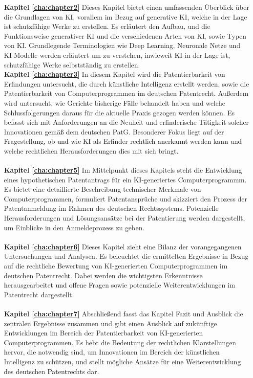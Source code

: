 \textbf{Kapitel \ref{cha:chapter2}} 
Dieses Kapitel bietet einen umfassenden Überblick über die Grundlagen
von KI, vorallem im Bezug auf generative KI, welche in der
Lage ist schutzfähige Werke zu erstellen.
Es erläutert den Aufbau, 
und die Funktionsweise generativer KI 
und die verschiedenen Arten von KI, sowie Typen von KI.
Grundlegende Terminologien wie Deep Learning, Neuronale Netze und
KI-Modelle werden erläutert um zu verstehen, inwieweit KI
in der Lage ist, schutzfähige Werke selbstständig zu erstellen.
\\
\textbf{Kapitel \ref{cha:chapter3}} 
In diesem Kapitel wird die Patentierbarkeit von Erfindungen untersucht,
die durch künstliche Intelligenz erstellt werden, 
sowie die Patentierbarkeit von Computerprogrammen im deutschen Patentrecht. 
Außerdem wird untersucht, wie Gerichte bisherige Fälle behandelt haben 
und welche Schlussfolgerungen daraus für die aktuelle Praxis gezogen werden können. 
Es befasst sich mit Anforderungen an die Neuheit 
und erfinderische Tätigkeit solcher Innovationen gemäß dem deutschen PatG. 
Besonderer Fokus liegt auf der Fragestellung, 
ob und wie KI als Erfinder rechtlich anerkannt werden kann 
und welche rechtlichen Herausforderungen dies mit sich bringt.
\\
\\
\textbf{Kapitel \ref{cha:chapter5}} 
Im Mittelpunkt dieses Kapitels steht die Entwicklung eines hypothetischen Patentantrags 
für ein KI-generiertes Computerprogrammm. 
Es bietet eine detaillierte Beschreibung technischer Merkmale von Computerprogrammen, 
formuliert Patentansprüche und 
skizziert den Prozess der Patentanmeldung im Rahmen des deutschen Rechtssystems. 
Potenzielle Herausforderungen und Lösungsansätze bei der Patentierung werden dargestellt, 
um Einblicke in den Anmeldeprozess zu geben.
\\
\\
\textbf{Kapitel \ref{cha:chapter6}} 
Dieses Kapitel zieht eine Bilanz der vorangegangenen Untersuchungen und Analysen. 
Es beleuchtet die ermittelten Ergebnisse in Bezug auf die rechtliche Bewertung 
von KI-generierten Computerprogrammen im deutschen Patentrecht. 
Dabei werden die wichtigsten Erkenntnisse herausgearbeitet 
und offene Fragen sowie potenzielle 
Weiterentwicklungen im Patentrecht dargestellt.
\\
\\
\textbf{Kapitel \ref{cha:chapter7}} 
Abschließend fasst das Kapitel Fazit und Ausblick die zentralen Ergebnisse zusammen 
und gibt einen Ausblick auf zukünftige Entwicklungen im Bereich der Patentierbarkeit 
von KI-generierten Computerprogrammen. 
Es hebt die Bedeutung der rechtlichen Klarstellungen hervor, 
die notwendig sind, um Innovationen im Bereich der künstlichen Intelligenz zu schützen, 
und stellt mögliche Ansätze für eine Weiterentwicklung des deutschen Patentrechts 
dar.